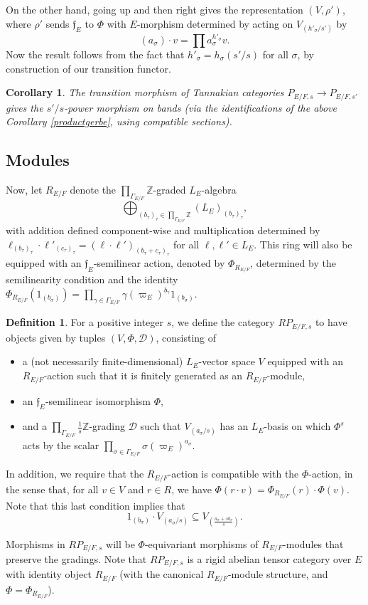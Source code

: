 \documentclass[11pt]{amsart}
\newtheorem{cor}[thm]{Corollary}
\theoremstyle{definition}
\newtheorem{defn}[thm]{Definition}
\newcommand{\mc}{\mathcal}
\newcommand{\Z}{\mathbb{Z}}
\newcommand{\mf}{\mathfrak}
\begin{document}
On the other hand, going up and then right gives the representation $(V, \rho')$, where $\rho'$ sends $\mf{f}_{E}$ to $\Phi$ with $E$-morphism determined by acting on $V_{(h'_{\sigma}/s')}$ by $$(a_{\sigma}) \cdot v= \prod a_{\sigma}^{h'_{\sigma}}v.$$ Now the result follows from the fact that $h'_{\sigma} = h_{\sigma}(s'/s)$ for all $\sigma$, by construction of our transition functor. 

\begin{cor} The transition morphism of Tannakian categories $P_{E/F,s} \to P_{E/F,s'}$ gives the $s'/s$-power morphism on bands (via the identifications of the above Corollary \ref{productgerbe}, using compatible sections).
\end{cor}

\subsection{Modules}\label{sec:mod}
Now, let $R_{E/F}$ denote the $\prod_{\Gamma_{E/F}}\Z$-graded $L_{E}$-algebra $$\bigoplus_{(b_{\tau})_{\tau} \in \prod_{\Gamma_{E/F}}\Z} (L_{E})_{(b_{\tau})_{\tau}},$$ with addition defined component-wise and multiplication determined by $\ell_{(b_{\tau})_{\tau}} \cdot \ell'_{(c_{\tau})_{\tau}} = (\ell \cdot \ell')_{(b_{\tau} + c_{\tau})_{\tau}}$ for all $\ell, \ell' \in L_{E}$. This ring will also be equipped with an $\mf{f}_{E}$-semilinear action, denoted by $\Phi_{R_{E/F}}$, determined by the semilinearity condition and the identity $\Phi_{R_{E/F}}(1_{(b_{\sigma})}) = \prod_{\gamma \in \Gamma_{E/F}} \gamma(\varpi_{E})^{b_{\gamma}}1_{(b_{\sigma})}$.
\begin{defn}
For a positive integer $s$, we define the category $RP_{E/F,s}$ to have objects given by tuples $(V, \Phi, \mc{D})$, consisting of
\begin{itemize}
    \item a (not necessarily finite-dimensional) $L_{E}$-vector space $V$  equipped with an $R_{E/F}$-action such that it is finitely generated as an $R_{E/F}$-module,
    \item an $\mf{f}_{E}$-semilinear isomorphism $\Phi$, 
    \item and a $\prod_{\Gamma_{E/F}} \frac{1}{s}\Z$-grading $\mc{D}$ such that $V_{(a_{\sigma}/s)}$ has an $L_{E}$-basis on which $\Phi^{s}$ acts by the scalar $\prod_{\sigma \in \Gamma_{E/F}} \sigma(\varpi_{E})^{a_{\sigma}}$.
\end{itemize}

In addition, we require that the $R_{E/F}$-action is compatible with the $\Phi$-action, in the sense that, for all $v \in V$ and $r \in R$, we have $\Phi(r \cdot v) = \Phi_{R_{E/F}}(r) \cdot \Phi(v)$. Note that this last condition implies that $$1_{(b_{\sigma})} \cdot V_{(a_{\sigma}/s)} \subseteq V_{(\frac{a_{\sigma} + sb_{\sigma}}{s})}.$$

Morphisms in $RP_{E/F,s}$ will be $\Phi$-equivariant morphisms of $R_{E/F}$-modules that preserve the gradings. Note that $RP_{E/F,s}$ is a rigid abelian tensor category over $E$ with identity object $R_{E/F}$ (with the canonical $R_{E/F}$-module structure, and $\Phi = \Phi_{R_{E/F}}$).
\end{defn}
\end{document}

